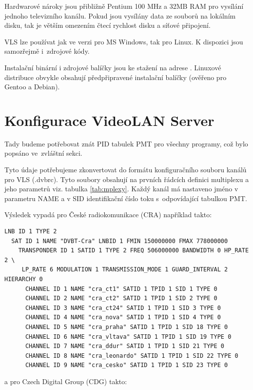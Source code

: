 Hardwarové nároky jsou přibližně Pentium 100 MHz a 32MB RAM pro vysílání jednoho televizního kanálu. Pokud jsou vysílány data ze souborů na lokálním disku, tak je větším omezením čtecí rychlost disku a síťové připojení.

VLS lze používat jak ve verzi pro MS Windows, tak pro Linux. K dispozici jsou samozřejmě i~zdrojové kódy.

Instalační binární i zdrojové balíčky jsou ke stažení na adrese \cite{videolanURL}.
Linuxové distribuce obvykle obsahují předpřipravené instalační balíčky (ověřeno pro Gentoo a Debian). 

\section{Konfigurace VideoLAN Server}
Tady budeme potřebovat znát PID tabulek PMT pro všechny programy, což bylo popsáno ve~zvláštní sekci.

Tyto údaje potřebujeme zkonvertovat do formátu konfiguračního souboru kanálů pro VLS \linebreak[4] (.dvbrc). Tyto soubory obsahují na prvních řádcích definici multiplexu a jeho parametrů viz. tabulka \ref{tab:mplexy}. Každý kanál má nastaveno jméno v parametru NAME a v SID identifikační číslo toku s~odpovídající tabulkou PMT.

Výsledek vypadá pro České radiokomunikace (CRA) například takto:

\begin{small}
\begin{verbatim}
LNB ID 1 TYPE 2
  SAT ID 1 NAME "DVBT-Cra" LNBID 1 FMIN 150000000 FMAX 778000000
    TRANSPONDER ID 1 SATID 1 TYPE 2 FREQ 506000000 BANDWIDTH 0 HP_RATE 2 \
     LP_RATE 6 MODULATION 1 TRANSMISSION_MODE 1 GUARD_INTERVAL 2 HIERARCHY 0
      CHANNEL ID 1 NAME "cra_ct1" SATID 1 TPID 1 SID 1 TYPE 0
      CHANNEL ID 2 NAME "cra_ct2" SATID 1 TPID 1 SID 2 TYPE 0
      CHANNEL ID 3 NAME "cra_ct24" SATID 1 TPID 1 SID 3 TYPE 0
      CHANNEL ID 4 NAME "cra_nova" SATID 1 TPID 1 SID 4 TYPE 0
      CHANNEL ID 5 NAME "cra_praha" SATID 1 TPID 1 SID 18 TYPE 0
      CHANNEL ID 6 NAME "cra_vltava" SATID 1 TPID 1 SID 19 TYPE 0
      CHANNEL ID 7 NAME "cra_ddur" SATID 1 TPID 1 SID 21 TYPE 0
      CHANNEL ID 8 NAME "cra_leonardo" SATID 1 TPID 1 SID 22 TYPE 0
      CHANNEL ID 9 NAME "cra_cesko" SATID 1 TPID 1 SID 23 TYPE 0
\end{verbatim}
\end{small}

a pro Czech Digital Group (CDG) takto:

